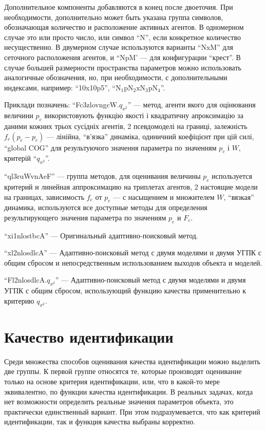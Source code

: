 Дополнительное компоненты добавляются в конец после двоеточия.
При необходимости, дополнительно может быть указана группа символов, обозначающая количество
и расположение активных агентов.
В одномерном случае это или просто число, или символ ``N'', если
конкретное количество несущественно. В двумерном случае
используются варианты ``NxM'' для сеточного расположения агентов,
и ``NpM'  --- для конфигурации ``крест''. В случае большей размерности
пространства параметров можно использовать аналогичные обозначения,
но, при необходимости, с дополнительными индексами, например:
``10x10p5'', ``$\mathrm{N_1 p N_2 x N_3 p N_4}$''.

Приклади позначень:
``Fc3zlovngcW.$q_{x^2}$''
--- метод, агенти якого для оцінювання величини $p_e$ використовують функцію
якості і квадратичну апроксимацію за даними кожних трьох сусідніх агентів, 2
псевдомоделі на границі, залежність $f_e (p_e-p_c)$ --- лінійна, ``в'язка''
динаміка, одиничний коефіцієнт при цій силі, ``global COG'' для результуючого
значення параметра по значенням $p_c$ і $W$, критерій
``$q_{x^2}$''.



``ql3ruWvnAeF''
--- группа методов,
для оценивания величины $p_e$ используется критерий и линейная аппроксимацию на триплетах агентов,
2 настоящие модели на границах,
зависимость $f_e$ от $p_e$ --- с насыщением и множителем $W$, ``вязкая'' динамика,
используются все доступные методы для определения  результирующего значения параметра
по значениям $p_e$ и $F_c$.

``xi1nlostbcA'' --- Оригинальный адаптивно-поисковый метод.

``xl2nlosdlcA'' --- Адаптивно-поисковый метод с двумя моделями и двумя УГПК с общим сбросом
 и непосредственным использованием выходов объекта и моделей.

``Fl2nlosdlcA.$q_{x^2}$'' --- Адаптивно-поисковый метод с двумя моделями и двумя УГПК с общим сбросом,
 использующий функцию качества применительно к критерию $q_{x^2}$.





\section{Качество идентификации}  %

Среди множества способов оценивания качества идентификации
можно выделить две группы.
К первой группе относятся те, которые производят оценивание
только на основе критерия идентификации, или,
что в какой-то мере эквивалентно, по функции качества идентификации.
В реальных задачах, когда нет возможности определить реальные значения
параметров объекта, это практически единственный вариант.
При этом подразумевается, что как критерий идентификации, так и
функция качества выбраны корректно.

